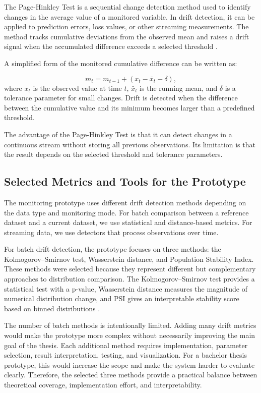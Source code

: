 The Page-Hinkley Test is a sequential change detection method used to identify changes in the average value of a monitored variable. In drift detection, it can be applied to prediction errors, loss values, or other streaming measurements. The method tracks cumulative deviations from the observed mean and raises a drift signal when the accumulated difference exceeds a selected threshold \cite{ComparativeConceptDriftDetectors}.

A simplified form of the monitored cumulative difference can be written as:

\begin{equation}
m_t = m_{t-1} + (x_t - \bar{x}_t - \delta),
\end{equation}
where $x_t$ is the observed value at time $t$, $\bar{x}_t$ is the running mean, and $\delta$ is a tolerance parameter for small changes. Drift is detected when the difference between the cumulative value and its minimum becomes larger than a predefined threshold.

The advantage of the Page-Hinkley Test is that it can detect changes in a continuous stream without storing all previous observations. Its limitation is that the result depends on the selected threshold and tolerance parameters.

\subsection{Selected Metrics and Tools for the Prototype}

The monitoring prototype uses different drift detection methods depending on the data type and monitoring mode. For batch comparison between a reference dataset and a current dataset, we use statistical and distance-based metrics. For streaming data, we use detectors that process observations over time.

For batch drift detection, the prototype focuses on three methods: the Kolmogorov--Smirnov test, Wasserstein distance, and Population Stability Index. These methods were selected because they represent different but complementary approaches to distribution comparison. The Kolmogorov--Smirnov test provides a statistical test with a p-value, Wasserstein distance measures the magnitude of numerical distribution change, and PSI gives an interpretable stability score based on binned distributions \cite{EvidentlyDataDriftLargeDatasets,SciPyDocumentation}.

The number of batch methods is intentionally limited. Adding many drift metrics would make the prototype more complex without necessarily improving the main goal of the thesis. Each additional method requires implementation, parameter selection, result interpretation, testing, and visualization. For a bachelor thesis prototype, this would increase the scope and make the system harder to evaluate clearly. Therefore, the selected three methods provide a practical balance between theoretical coverage, implementation effort, and interpretability.

